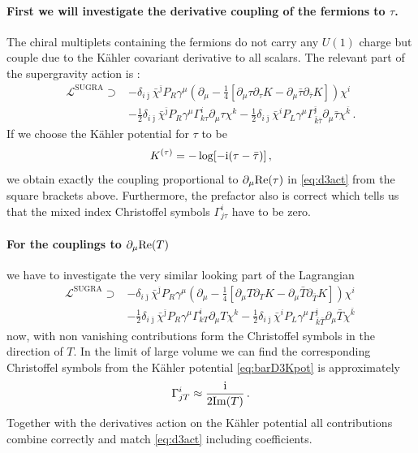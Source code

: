 \documentclass[12pt]{report}
\newcommand{\be}{\begin{equation}}
\newcommand{\ee}{\end{equation}}
\newcommand{\bea}{\begin{equation}\begin{aligned}}
\newcommand{\eea}{\end{aligned}\end{equation}}
\def\rmi{{\rm i}}
\def\jb{{\bar \jmath}}
\def\rmre{{\rm Re}}
\def\rmim{{\rm Im}}
\begin{document}
\paragraph{First we will investigate the derivative coupling of the fermions to $\tau$.} The chiral multiplets containing the fermions do not carry any $U(1)$ charge but couple due to the Kähler covariant derivative to all scalars. The relevant part of the supergravity action is \cite{Freedman:2012zz}:
\bea
\mathcal{L}^{\text{SUGRA}} \supset &-\delta_{i\jb}\bar{\chi}^\jb P_R \gamma^\mu \left(\partial_\mu - \frac{1}{4}[\partial_\mu \tau\partial_\tau K - \partial_\mu \bar{\tau}\partial_{\bar{\tau}} K] \right) \chi^i\\
&-\frac{1}{2} \delta_{i\jb} \bar{\chi}^\jb P_R \gamma^\mu \Gamma^i_{k\tau}\partial_\mu \tau \chi^k - \frac{1}{2} \delta_{i\jb} \bar{\chi}^i P_L \gamma^\mu \Gamma^\jb_{\bar{k}\bar{\tau}} \partial_\mu \bar{\tau} \chi^{\bar{k}}\,.
\eea 
If we choose the Kähler potential for $\tau$ to be
\be 
K^{(\tau)} = - \log [-\rmi (\tau -\bar{\tau})]\,,
\ee
we obtain exactly the coupling proportional to $\partial_\mu \rmre(\tau)$ in \eqref{eq:d3act} from the square brackets above. Furthermore, the prefactor also is correct which tells us that the mixed index Christoffel symbols $\Gamma^i_{j\tau}$ have to be zero.
\paragraph{For the couplings to $\partial_\mu \rmre(T)$} we have to investigate the very similar looking part of the Lagrangian
\bea
\mathcal{L}^{\text{SUGRA}} \supset & - \delta_{i\jb} \bar{\chi}^\jb P_R \gamma^\mu \left( \partial_\mu -\frac{1}{4} [\partial_\mu T \partial_T K - \partial_\mu \bar{T} \partial_{\bar{T}} K]\right) \chi^i\\
&- \frac{1}{2} \delta_{i\jb} \bar{\chi}^\jb P_R \gamma^\mu \Gamma^i_{kT} \partial_\mu T \chi^k - \frac{1}{2} \delta_{i\jb} \bar{\chi}^i P_L \gamma^\mu \Gamma^{\jb}_{\bar{k}\bar{T}} \partial_\mu \bar{T} \chi^{\bar{k}}\,
\eea
now, with non vanishing contributions form the Christoffel symbols in the direction of $T$. In the limit of large volume we can find the corresponding Christoffel symbols from the Kähler potential \eqref{eq:barD3Kpot} is approximately
\be 
\Gamma^{i}_{jT} \approx \frac{\rmi}{2 \rmim(T)}\,.
\ee
Together with the derivatives action on the Kähler potential all contributions combine correctly and match \eqref{eq:d3act} including coefficients.
\end{document}
